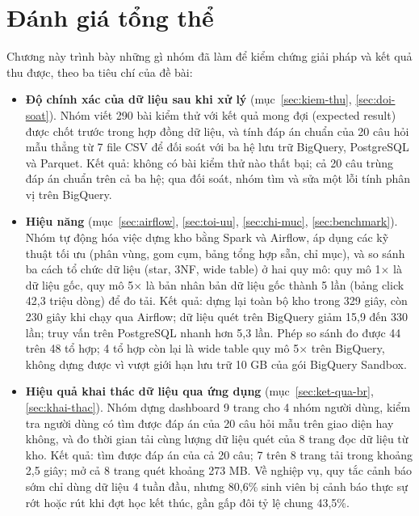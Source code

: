\section{Đánh giá tổng thể}
\label{sec:danh-gia}

Chương này trình bày những gì nhóm đã làm để kiểm chứng giải pháp và kết quả thu được, theo ba
tiêu chí của đề bài:

\begin{itemize}
  \item \textbf{Độ chính xác của dữ liệu sau khi xử lý} (mục~\ref{sec:kiem-thu},
        \ref{sec:doi-soat}). Nhóm viết 290 bài kiểm thử với kết quả mong đợi (expected result)
        được chốt trước trong hợp đồng dữ liệu, và tính đáp án chuẩn của 20 câu hỏi mẫu thẳng từ 7 file CSV để đối soát với ba hệ
        lưu trữ BigQuery, PostgreSQL và Parquet. Kết quả: không có bài kiểm thử nào thất bại; cả
        20 câu trùng đáp án chuẩn trên cả ba hệ; qua đối soát, nhóm tìm và sửa một lỗi tính phân
        vị trên BigQuery.
  \item \textbf{Hiệu năng} (mục~\ref{sec:airflow}, \ref{sec:toi-uu}, \ref{sec:chi-muc},
        \ref{sec:benchmark}). Nhóm tự động hóa việc dựng kho bằng Spark và Airflow, áp dụng các kỹ
        thuật tối ưu (phân vùng, gom cụm, bảng tổng hợp sẵn, chỉ mục), và so sánh ba cách tổ chức
        dữ liệu (star, 3NF, wide table) ở hai quy mô: quy mô 1$\times$ là dữ liệu gốc, quy mô
        5$\times$ là bản nhân bản dữ liệu gốc thành 5 lần (bảng click 42,3 triệu dòng) để đo tải.
        Kết quả: dựng lại toàn bộ kho trong 329 giây, còn 230 giây khi chạy qua Airflow; dữ liệu
        quét trên BigQuery giảm 15,9 đến 330 lần; truy vấn trên PostgreSQL nhanh hơn 5,3 lần. Phép
        so sánh đo được 44 trên 48 tổ hợp; 4 tổ hợp còn lại là wide table quy mô 5$\times$ trên
        BigQuery, không dựng được vì vượt giới hạn lưu trữ 10 GB của gói BigQuery Sandbox.
  \item \textbf{Hiệu quả khai thác dữ liệu qua ứng dụng} (mục~\ref{sec:ket-qua-br},
        \ref{sec:khai-thac}). Nhóm dựng dashboard 9 trang cho 4 nhóm người dùng, kiểm tra người
        dùng có tìm được đáp án của 20 câu hỏi mẫu trên giao diện hay không, và đo thời gian tải
        cùng lượng dữ liệu quét của 8 trang đọc dữ liệu từ kho. Kết quả: tìm được đáp án của cả 20
        câu; 7 trên 8 trang tải trong khoảng 2,5 giây; mở cả 8 trang quét khoảng 273 MB. Về nghiệp vụ, quy tắc
        cảnh báo sớm chỉ dùng dữ liệu 4 tuần đầu, nhưng 80,6\% sinh viên bị cảnh báo thực sự rớt
        hoặc rút khi đợt học kết thúc, gần gấp đôi tỷ lệ chung 43,5\%.
\end{itemize}

